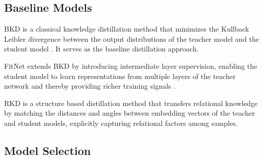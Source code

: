 \documentclass[11pt]{article}
\begin{document}
\subsection{Baseline Models}

BKD is a classical knowledge distillation method that minimizes the Kullback Leibler divergence between the output distributions of the teacher model and the student model \citep{hinton2015distilling}. It serves as the baseline distillation approach.

FitNet extends BKD by introducing intermediate layer supervision, enabling the student model to learn representations from multiple layers of the teacher network and thereby providing richer training signals \citep{romero2015fitnets}.

RKD is a structure based distillation method that transfers relational knowledge by matching the distances and angles between embedding vectors of the teacher and student models, explicitly capturing relational factors among samples.


\begin{table}[t]
\centering
\caption{Statistical data of two datasets}
\label{tab:dataset_statistics}
\end{table}


\begin{table}[t]
\centering
\caption{Introduction of classic TKG models}
\label{tab:tkg_models}
\end{table}

\subsection{Model Selection}
\end{document}
